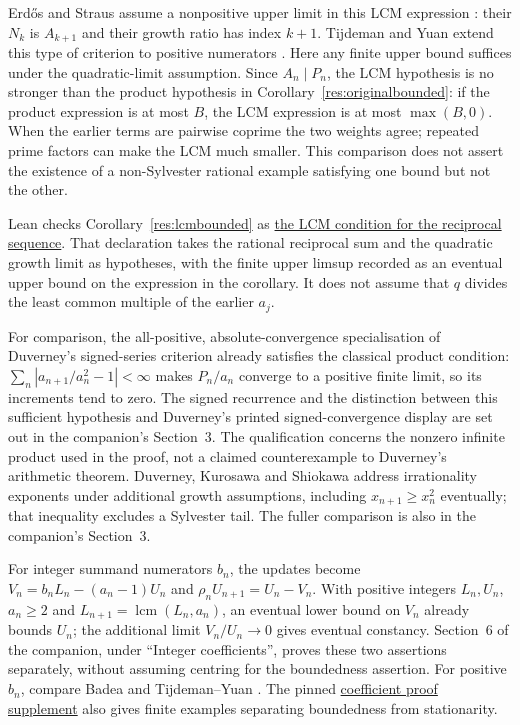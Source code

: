 \documentclass[11pt]{article}
\begin{document}
Erd\H{o}s and Straus assume a nonpositive upper limit in this LCM
expression \cite[Theorem~3, p.~132]{erdosstraus1964}: their $N_k$ is
$A_{k+1}$ and their growth ratio has index $k+1$. Tijdeman and Yuan
extend this type of criterion to positive numerators
\cite{tijdemanyuan2002}. Here any finite upper bound suffices under
the quadratic-limit assumption. Since $A_n\mid P_n$,
the LCM hypothesis is no stronger than the product hypothesis in
Corollary~\ref{res:originalbounded}: if the product expression is at most
$B$, the LCM expression is at most $\max(B,0)$. When the earlier terms
are pairwise coprime the two weights agree; repeated prime factors can
make the LCM much smaller. This comparison does not assert the existence
of a non-Sylvester rational example satisfying one bound but not the other.

Lean checks Corollary~\ref{res:lcmbounded} as
\href{https://github.com/wcook04/plectis-erdos/blob/3d6d938d696fed0fb71dd55115a18a73738ff223/lean/ErdosProblems/Erdos243/PaperCompleteR7/LcmDefect.lean#L49}{the LCM condition for the reciprocal sequence}.
That declaration takes the rational reciprocal sum and the quadratic growth
limit as hypotheses, with the finite upper limsup recorded as an eventual
upper bound on the expression in the corollary. It does not assume that
$q$ divides the least common multiple of the earlier $a_j$.

For comparison, the all-positive, absolute-convergence specialisation
of Duverney's signed-series criterion
\cite[Corollary~3.2, p.~287]{duverney2001} already satisfies the classical
product condition: $\sum_n|a_{n+1}/a_n^2-1|<\infty$ makes $P_n/a_n$
converge to a positive finite limit, so its increments tend to zero.
The signed recurrence and the distinction between this sufficient
hypothesis and Duverney's printed signed-convergence display are set out
in the companion's Section~3. The qualification concerns the nonzero infinite product used
in the proof, not a claimed counterexample to Duverney's arithmetic theorem.
Duverney, Kurosawa and Shiokawa
\cite[Theorem~1, author-version p.~2]{duverneykurosawashiokawa2020}
address irrationality exponents under additional growth assumptions,
including $x_{n+1}\ge x_n^2$ eventually; that inequality excludes a
Sylvester tail. The fuller comparison is also in the companion's Section~3.

For integer summand numerators $b_n$, the updates become
$V_n=b_nL_n-(a_n-1)U_n$ and $\rho_nU_{n+1}=U_n-V_n$.
With positive integers $L_n,U_n$, $a_n\ge2$ and
$L_{n+1}=\operatorname{lcm}(L_n,a_n)$, an eventual lower bound on $V_n$
already bounds $U_n$; the additional limit $V_n/U_n\to0$ gives eventual
constancy. Section~6 of the companion, under ``Integer coefficients'',
proves these two assertions separately, without assuming centring for
the boundedness assertion. For positive $b_n$, compare Badea
\cite[p.~316]{badea1993} and Tijdeman--Yuan \cite{tijdemanyuan2002}.
The pinned
\href{https://github.com/wcook04/plectis-erdos/blob/eccd8afc6db3c02a2265d0601b727d6c5e4467d5/lean/ErdosProblems/Erdos243/CoefficientUniformBoundedHeight.md}
{coefficient proof supplement} also gives finite examples separating
boundedness from stationarity.
\end{document}
